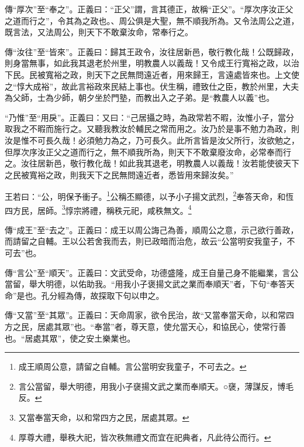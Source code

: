 {\noindent\zhuan{}\fzbyks 傳“厚次”至“奉之”。正義曰：“正父”謂，言其德正，故稱“正父”。“厚次序汝正父之道而行之”，令其為之政也。、周公俱是大聖，無不順我所為。又令法周公之道，既言法，又法周公，則天下不敢棄汝命，常奉行之。 \par}

{\noindent\zhuan{}\fzbyks 傳“汝往”至“皆來”。正義曰：歸其王政令，汝往居新邑，敬行教化哉！公既歸政，則身當無事，如此我其退老於州里，明教農人以義哉！又令成王行寬裕之政，以治下民。民被寬裕之政，則天下之民無問遠近者，用來歸王，言遠處皆來也。上文使之“惇大成裕”，故此言裕政來民結上事也。伏生稱，禮致仕之臣，教於州里，大夫為父師，士為少師，朝夕坐於門塾，而教出入之子弟。是“教農人以義”也。 \par}

{\noindent\shu{}\fzkt “乃惟”至“用戾”。正義曰：又曰：“己居攝之時，為政常若不暇，汝惟小子，當分取我之不暇而施行之。又聽我教汝於輔民之常而用之。汝乃於是事不勉力為政，則汝是惟不可長久哉！必須勉力為之，乃可長久。此所言皆是汝父所行，汝欲勉之，但厚次序汝正父之道而行之，無不順我所為，則天下不敢棄廢汝命，必常奉而行之。汝往居新邑，敬行教化哉！如此我其退老，明教農人以義哉！汝若能使彼天下之民被寬裕之政，則我天下之民無問遠近者，悉皆用來歸汝矣。” \par}

王若曰：“公，明保予衝子。\footnote{成王順周公意，請留之自輔。言公當明安我童子，不可去之。}公稱丕顯德，以予小子揚文武烈，\footnote{言公當留，舉大明德，用我小子襃揚文武之業而奉順天。○襃，薄謀反，博毛反。}奉答天命，和恆四方民，居師。\footnote{又當奉當天命，以和常四方之民，居處其眾。}惇宗將禮，稱秩元祀，咸秩無文。\footnote{厚尊大禮，舉秩大祀，皆次秩無禮文而宜在祀典者，凡此待公而行。}


{\noindent\zhuan{}\fzbyks 傳“成王”至“去之”。正義曰：成王以周公誨己為善，順周公之意，示己欲行善政，而請留之自輔。王以公若舍我而去，則已政暗而治危，故云“公當明安我童子，不可去”也。 \par}

{\noindent\zhuan{}\fzbyks 傳“言公”至“順天”。正義曰：文武受命，功德盛隆，成王自量己身不能繼業，言公當留，舉大明德，以佑助我。“用我小子褒揚文武之業而奉順天”者，下句“奉答天命”是也。孔分經為傳，故探取下句以申之。 \par}

{\noindent\zhuan{}\fzbyks 傳“又當”至“其眾”。正義曰：天命周家，欲令民治，故“又當奉當天命，以和常四方之民，居處其眾”也。“奉當”者，尊天意，使允當天心，和協民心，使常行善也。“居處其眾”，使之安土樂業也。 \par}

